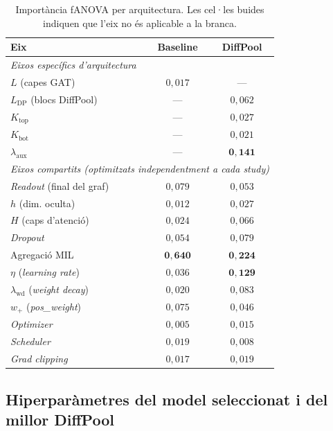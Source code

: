 \documentclass[10pt,a4paper,twocolumn,twoside]{article}
\begin{document}
\begin{table}[H]
\centering
\caption{Importància fANOVA per arquitectura. Les cel·les buides indiquen que l'eix no és aplicable a la branca.}
\label{tab:main-effects}
\small
\begin{tabular}{lcc}
\toprule
\textbf{Eix} & \textbf{Baseline} & \textbf{DiffPool} \\
\midrule
\multicolumn{3}{l}{\textit{Eixos específics d'arquitectura}} \\[2pt]
$L$ (capes GAT)                           & $0{,}017$ & --- \\
$L_{\text{DP}}$ (blocs DiffPool)          & --- & $0{,}062$ \\
$K_{\text{top}}$                          & --- & $0{,}027$ \\
$K_{\text{bot}}$                          & --- & $0{,}021$ \\
$\lambda_{\text{aux}}$                    & --- & $\mathbf{0{,}141}$ \\
\midrule
\multicolumn{3}{l}{\textit{Eixos compartits (optimitzats independentment a cada study)}} \\[2pt]
\textit{Readout} (final del graf)         & $0{,}079$ & $0{,}053$ \\
$h$ (dim. oculta)                         & $0{,}012$ & $0{,}027$ \\
$H$ (caps d'atenció)                      & $0{,}024$ & $0{,}066$ \\
\textit{Dropout}                          & $0{,}054$ & $0{,}079$ \\
Agregació MIL                             & $\mathbf{0{,}640}$ & $\mathbf{0{,}224}$ \\
$\eta$ (\textit{learning rate})           & $0{,}036$ & $\mathbf{0{,}129}$ \\
$\lambda_{\text{wd}}$ (\textit{weight decay}) & $0{,}020$ & $0{,}083$ \\
$w_+$ (\textit{pos\_weight})              & $0{,}075$ & $0{,}046$ \\
\textit{Optimizer}                        & $0{,}005$ & $0{,}015$ \\
\textit{Scheduler}                        & $0{,}019$ & $0{,}008$ \\
\textit{Grad clipping}                    & $0{,}017$ & $0{,}019$ \\
\bottomrule
\end{tabular}
\end{table}

\subsection{Hiperparàmetres del model seleccionat i del millor DiffPool}
\label{app:best-params}
\end{document}
